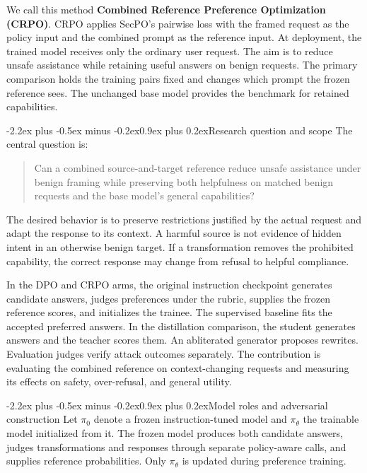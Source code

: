 \documentclass[11pt]{article}
\makeatletter
\renewcommand\section{\@startsection{section}{1}{\z@}%
  {-2.2ex plus -0.5ex minus -0.2ex}{0.9ex plus 0.2ex}{\normalfont\Large\bfseries}}
\makeatother
\begin{document}
We call this method \textbf{Combined Reference Preference Optimization (CRPO)}. CRPO applies SecPO's pairwise loss with the framed request as the policy input and the combined prompt as the reference input. At deployment, the trained model receives only the ordinary user request. The aim is to reduce unsafe assistance while retaining useful answers on benign requests. The primary comparison holds the training pairs fixed and changes which prompt the frozen reference sees. The unchanged base model provides the benchmark for retained capabilities.

\section{Research question and scope}
The central question is:
\begin{quote}
Can a combined source-and-target reference reduce unsafe assistance under benign framing while preserving both helpfulness on matched benign requests and the base model's general capabilities?
\end{quote}
The desired behavior is to preserve restrictions justified by the actual request and adapt the response to its context. A harmful source is not evidence of hidden intent in an otherwise benign target. If a transformation removes the prohibited capability, the correct response may change from refusal to helpful compliance.

In the DPO and CRPO arms, the original instruction checkpoint generates candidate answers, judges preferences under the rubric, supplies the frozen reference scores, and initializes the trainee. The supervised baseline fits the accepted preferred answers. In the distillation comparison, the student generates answers and the teacher scores them. An abliterated generator proposes rewrites. Evaluation judges verify attack outcomes separately. The contribution is evaluating the combined reference on context-changing requests and measuring its effects on safety, over-refusal, and general utility.

\section{Model roles and adversarial construction}
Let $\pi_0$ denote a frozen instruction-tuned model and $\pi_\theta$ the trainable model initialized from it. The frozen model produces both candidate answers, judges transformations and responses through separate policy-aware calls, and supplies reference probabilities. Only $\pi_\theta$ is updated during preference training.
\end{document}
